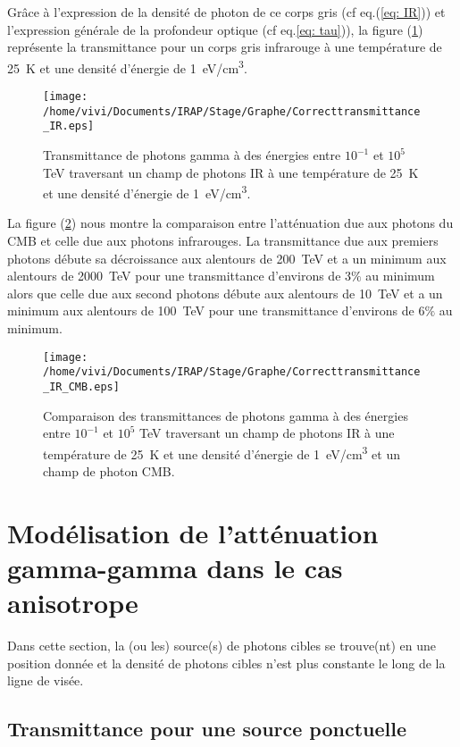 \documentclass[a4paper,12pt,twoside]{article}
\begin{document}
Grâce à l'expression de la densité de photon de ce corps gris (cf eq.(\ref{eq: IR})) et l'expression générale de la profondeur optique (cf eq.\ref{eq: tau})), la figure (\ref{fig: IR}) représente la transmittance pour un corps gris infrarouge à une température de \SI{25}{\K} et une densité d'énergie de \SI{1}{\eV/\cm^3}.

\begin{figure}
	\centering
    \texttt{[image: /home/vivi/Documents/IRAP/Stage/Graphe/Correcttransmittance\_IR.eps]}
    \caption{Transmittance de photons gamma à des énergies entre $10^{-1}$ et $10^5$ \si{\TeV} traversant un champ de photons IR à une température de \SI{25}{\K} et une densité d'énergie de \SI{1}{\eV/\cm^3}.}
    \label{fig: IR}
\end{figure}

La figure (\ref{fig: comparaison}) nous montre la comparaison entre l'atténuation due aux photons du CMB et celle due aux photons infrarouges. La transmittance due aux premiers photons débute sa décroissance aux alentours de \SI{200}{\TeV} et a un minimum aux alentours de \SI{2000}{\TeV} pour une transmittance d'environs de 3$\%$ au minimum alors que celle due aux second photons débute aux alentours de \SI{10}{\TeV} et a un minimum aux alentours de \SI{100}{\TeV} pour une transmittance d'environs de 6$\%$ au minimum.

\begin{figure}[H]
	\centering
    \texttt{[image: /home/vivi/Documents/IRAP/Stage/Graphe/Correcttransmittance\_IR\_CMB.eps]}
    \caption{Comparaison des transmittances de photons gamma à des énergies entre $10^{-1}$ et $10^5$ \si{\TeV} traversant un champ de photons IR à une température de \SI{25}{\K} et une densité d'énergie de \SI{1}{\eV/\cm^3} et un champ de photon CMB.}
    \label{fig: comparaison}
\end{figure}
\newpage

\section{Modélisation de l'atténuation gamma-gamma dans le cas anisotrope}

Dans cette section, la (ou les) source(s) de photons cibles se trouve(nt) en une position donnée et la densité de photons cibles n'est plus constante le long de la ligne de visée.

\subsection{Transmittance pour une source ponctuelle}
\end{document}
